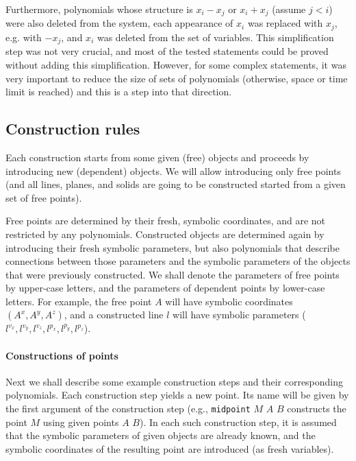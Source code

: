 \documentclass{aicom2e}
\begin{document}
Furthermore, polynomials whose structure is $x_i - x_j$ or $x_i + x_j$
(assume $j < i$) were also deleted from the system, each appearance of
$x_i$ was replaced with $x_j$, e.g. with $-x_j$, and $x_i$ was deleted
from the set of variables. This simplification step was not very
crucial, and most of the tested statements could be proved without
adding this simplification. However, for some complex statements, it
was very important to reduce the size of sets of polynomials
(otherwise, space or time limit is reached) and this is a step into
that direction.


\subsection{Construction rules}


Each construction starts from some given (free) objects and proceeds
by introducing new (dependent) objects. We will allow introducing only
free points (and all lines, planes, and solids are going to be
constructed started from a given set of free points).

Free points are determined by their fresh, symbolic coordinates, and
are not restricted by any polynomials. Constructed objects are
determined again by introducing their fresh symbolic parameters, but
also polynomials that describe connections between those parameters
and the symbolic parameters of the objects that were previously
constructed. We shall denote the parameters of free points by
upper-case letters, and the parameters of dependent points by
lower-case letters. For example, the free point $A$ will have symbolic
coordinates $({A}^x, {A}^y, {A}^z)$, and a constructed line $l$ will
have symbolic parameters (${l}^{v_x}, {l}^{v_y}, {l}^{v_z}, {l}^{p_x},
{l}^{p_y}, {l}^{p_z}$).


\paragraph{Constructions of points}

Next we shall describe some example construction steps and their
corresponding polynomials. Each construction step yields a new
point. Its name will be given by the first argument of the
construction step (e.g., {\tt midpoint} $M$ $A$ $B$ constructs the
point $M$ using given points $A$ $B$). In each such construction step,
it is assumed that the symbolic parameters of given objects are
already known, and the symbolic coordinates of the resulting point are
introduced (as fresh variables).
\end{document}
